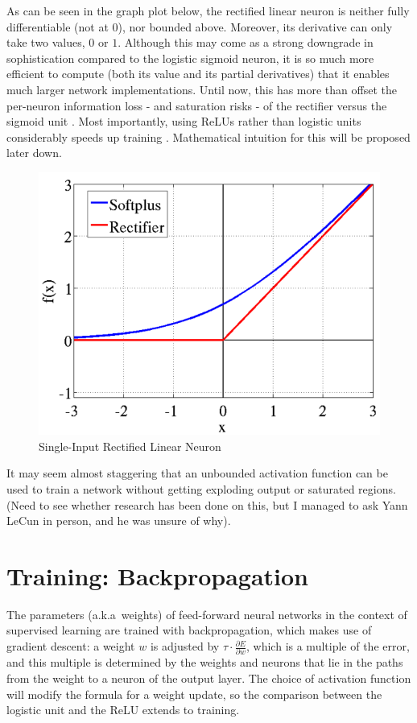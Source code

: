 \documentclass[a4paper,11pt]{article}
\begin{document}
As can be seen in the graph plot below, the rectified linear neuron is neither fully differentiable (not at $0$), nor bounded above. Moreover, its derivative can only take two values, $0$ or $1$. Although this may come as a strong downgrade in sophistication compared to the logistic sigmoid neuron, it is so much more efficient to compute (both its value and its partial derivatives) that it enables much larger network implementations\cite{krizhevsky}. Until now, this has more than offset the per-neuron information loss - and saturation risks - of the rectifier versus the sigmoid unit \cite{rectifier}. Most importantly, using ReLUs rather than logistic units considerably speeds up training \cite{krizhevsky}. Mathematical intuition for this will be proposed later down.

\begin{figure}[h!]
	\centering
	\includegraphics[scale=0.5]{images/rectifier.png}
	\caption{Single-Input Rectified Linear Neuron}
\end{figure}

It may seem almost staggering that an unbounded activation function can be used to train a network without getting exploding output or saturated regions. (Need to see whether research has been done on this, but I managed to ask Yann LeCun in person, and he was unsure of why).


\section{Training: Backpropagation}

The parameters (a.k.a\ weights) of feed-forward neural networks in the context of supervised learning are trained with backpropagation, which makes use of gradient descent: a weight $w$ is adjusted by $\tau \cdot \frac{\partial{E}}{\partial{w}}$, which is a multiple of the error, and this multiple is determined by the weights and neurons that lie in the paths from the weight to a neuron of the output layer. The choice of activation function will modify the formula for a weight update, so the comparison between the logistic unit and the ReLU extends to training.
\end{document}
